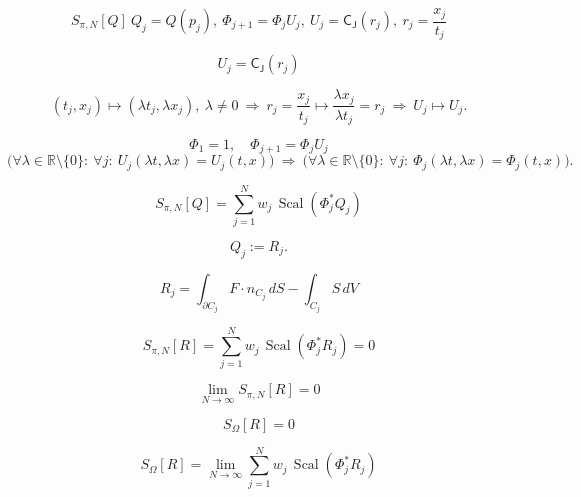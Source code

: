 \documentclass[12pt]{article}
\begin{document}
\begin{equation}
S_{\pi,N}[Q]\ Q_j=Q(p_j),\ \Phi_{j+1}=\Phi_j U_j,\ U_j=\mathsf{C}_{\mathsf{J}}(r_j),\ r_j=\frac{x_j}{t_j}
\end{equation}

\begin{equation}
U_j=\mathsf{C}_{\mathsf{J}}(r_j)
\end{equation}

\begin{equation}
(t_j,x_j)\mapsto(\lambda t_j,\lambda x_j),\ \lambda\neq 0
\ \Longrightarrow\ 
r_j=\frac{x_j}{t_j}\mapsto \frac{\lambda x_j}{\lambda t_j}=r_j
\ \Longrightarrow\
U_j\mapsto U_j.
\end{equation}

\begin{equation}
\Phi_{1}=1,\quad \Phi_{j+1}=\Phi_{j}U_j
\end{equation}
\begin{equation}
\Big(\forall \lambda\in\mathbb{R}\setminus\{0\}:\ \forall j:\ U_j(\lambda t,\lambda x)=U_j(t,x)\Big)
\ \Longrightarrow\
\Big(\forall \lambda\in\mathbb{R}\setminus\{0\}:\ \forall j:\ \Phi_j(\lambda t,\lambda x)=\Phi_j(t,x)\Big).
\end{equation}

\begin{equation}
S_{\pi,N}[Q]=\sum_{j=1}^N w_j\,\operatorname{Scal}(\Phi_j^{*}Q_j)
\end{equation}

\begin{equation}
Q_j:=R_j.
\end{equation}

\begin{equation}
R_j=\int_{\partial C_j}F\cdot n_{C_j}\,dS-\int_{C_j}S\,dV
\end{equation}

\begin{equation}
S_{\pi,N}[R]=\sum_{j=1}^N w_j\,\operatorname{Scal}(\Phi_j^{*}R_j)=0
\end{equation}

\begin{equation}
\lim_{N\to\infty} S_{\pi,N}[R]=0
\end{equation}

\begin{equation}
S_\Omega[R]=0
\end{equation}

\begin{equation}
S_\Omega[R]=\lim_{N\to\infty}\sum_{j=1}^N w_j\,\operatorname{Scal}(\Phi_j^{*}R_j)
\end{equation}
\end{document}
